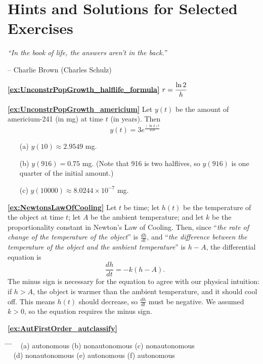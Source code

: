 %
\chapter[Hints and Solutions]{Hints and Solutions for Selected Exercises}

\noindent
\emph{``In the book of life, the answers aren't in the back.''}

\hfill        -- Charlie Brown (Charles Schulz)

\bigskip
\textbf{\ref{ex:UnconstrPopGrowth_halflife_formula}} $\displaystyle r = \frac{\ln 2}{h}$

\medskip
\textbf{\ref{ex:UnconstrPopGrowth_americium}}
Let $y(t)$ be the amount of americium-241
(in mg) at time $t$ (in years). Then
\[
   y(t) = 3e^{\frac{(\ln 2)t}{458}}
\]
\begin{enumerate}
\item[(a)] $y(10) \approx 2.9549$ mg.
\item[(b)] $y(916) = 0.75$ mg. (Note that 916 is two halflives, so $y(916)$
is one quarter of the initial amount.)
\item[(c)] $y(10000) \approx 8.0244\times 10^{-7}$ mg.
\end{enumerate}

\medskip
\textbf{\ref{ex:NewtonsLawOfCooling}}
Let $t$ be time;
let $h(t)$ be the temperature of the object
at time $t$;
let $A$ be the ambient temperature;
and let $k$ be the proportionality constant in
Newton's Law of Cooling.
Then, since ``\emph{the rate of change of the temperature of the
object}'' is $\frac{dh}{dt}$, and ``\emph{the difference
between the temperature of the object and the ambient
temperature}'' is $h-A$, the differential equation is
\[
   \frac{dh}{dt} = - k (h-A).
\]
The minus sign is necessary for the equation to agree with
our physical intuition: if $h>A$, the object is warmer than the ambient
temperature, and it should cool off. This means $h(t)$ should
decrease, so $\frac{dh}{dt}$ must be negative.  We assumed
$k>0$, so the equation requires the minus sign.

\medskip
\textbf{\ref{ex:AutFirstOrder_autclassify}}
\begin{tabbing}
\hspace*{0.25in} \= \hspace*{1.5in} \= \hspace*{1.5in} \= \kill
~ \> 
(a) autonomous \>
(b) nonautonomous \>
(c) nonautonomous \\[2pt]
~ \>
(d) nonautonomous \>
(e) autonomous \>
(f) autonomous
\end{tabbing}

